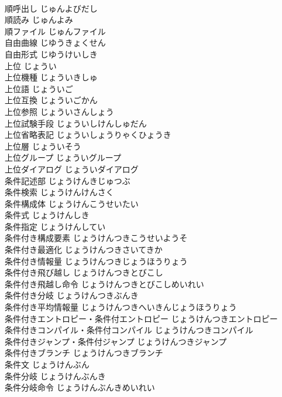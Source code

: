 \documentclass[8pt]{extreport}
\begin{document}
\begin{CJK}{UTF8}{min}
\\	順呼出し	じゅんよびだし	
\\	順読み	じゅんよみ	
\\	順ファイル	じゅんファイル	
\\	自由曲線	じゆうきょくせん	
\\	自由形式	じゆうけいしき	
\\	上位	じょうい	
\\	上位機種	じょういきしゅ	
\\	上位語	じょういご	
\\	上位互換	じょういごかん	
\\	上位参照	じょういさんしょう	
\\	上位試験手段	じょういしけんしゅだん	
\\	上位省略表記	じょういしょうりゃくひょうき	
\\	上位層	じょういそう	
\\	上位グループ	じょういグループ	
\\	上位ダイアログ	じょういダイアログ	
\\	条件記述部	じょうけんきじゅつぶ	
\\	条件検索	じょうけんけんさく	
\\	条件構成体	じょうけんこうせいたい	
\\	条件式	じょうけんしき	
\\	条件指定	じょうけんしてい	
\\	条件付き構成要素	じょうけんつきこうせいようそ	
\\	条件付き最適化	じょうけんつきさいてきか	
\\	条件付き情報量	じょうけんつきじょうほうりょう	
\\	条件付き飛び越し	じょうけんつきとびこし	
\\	条件付き飛越し命令	じょうけんつきとびこしめいれい	
\\	条件付き分岐	じょうけんつきぶんき	
\\	条件付き平均情報量	じょうけんつきへいきんじょうほうりょう	
\\	条件付きエントロピー・条件付エントロピー	じょうけんつきエントロピー	
\\	条件付きコンパイル・条件付コンパイル	じょうけんつきコンパイル	
\\	条件付きジャンプ・条件付ジャンプ	じょうけんつきジャンプ	
\\	条件付きブランチ	じょうけんつきブランチ	
\\	条件文	じょうけんぶん	
\\	条件分岐	じょうけんぶんき	
\\	条件分岐命令	じょうけんぶんきめいれい	

\end{CJK}
\end{document}
